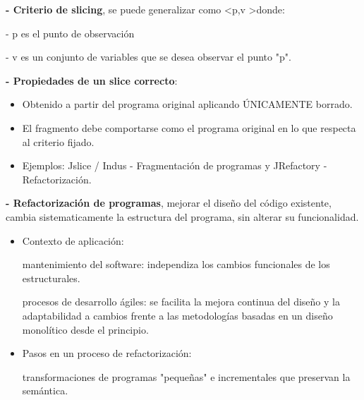 \documentclass[12pt]{amsart}
\begin{document}
    \textbf{- Criterio de slicing}, se puede generalizar como
        \textless p,v \textgreater donde:
        
        - p es el punto de observación

        - v es un conjunto de variables que se desea observar
        el punto "p".

    \textbf{- Propiedades de un slice correcto}:

    \begin{itemize}
        \item Obtenido a partir del programa original aplicando
        ÚNICAMENTE borrado.
        \item El fragmento debe comportarse como el programa original
        en lo que respecta al criterio fijado.
        \item Ejemplos: Jslice / Indus - Fragmentación de programas y
        JRefactory - Refactorización.
    \end{itemize}

    \textbf{- Refactorización de programas}, mejorar el diseño del código
    existente, cambia sistematicamente la estructura del
    programa, sin alterar su funcionalidad.

    \begin{itemize}
        \item Contexto de aplicación:
        
        \textrightarrow mantenimiento del
        software: independiza los cambios funcionales de los
        estructurales.

        \textrightarrow procesos de desarrollo ágiles: se
        facilita la mejora continua del diseño y la adaptabilidad
        a cambios frente a las metodologías basadas en un
        diseño monolítico desde el principio.

        \item Pasos en un proceso de refactorización:

        \textrightarrow transformaciones de programas "pequeñas"
        e incrementales que preservan la semántica.
    \end{itemize}
    
\end{document}
